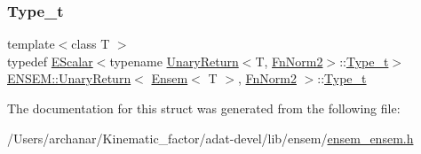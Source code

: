 \mbox{\label{structENSEM_1_1UnaryReturn_3_01Ensem_3_01T_01_4_00_01FnNorm2_01_4_ab4124c6816741e910b729ef32c1a9c37}} 
\subsubsection{\texorpdfstring{Type\_t}{Type\_t}\hspace{0.1cm}{\footnotesize\ttfamily [3/3]}}
{\footnotesize\ttfamily template$<$class T $>$ \\
typedef \mbox{\hyperlink{classENSEM_1_1EScalar}{E\+Scalar}}$<$typename \mbox{\hyperlink{structENSEM_1_1UnaryReturn}{Unary\+Return}}$<$T, \mbox{\hyperlink{structENSEM_1_1FnNorm2}{Fn\+Norm2}}$>$\+::\mbox{\hyperlink{structENSEM_1_1UnaryReturn_3_01Ensem_3_01T_01_4_00_01FnNorm2_01_4_ab4124c6816741e910b729ef32c1a9c37}{Type\+\_\+t}}$>$ \mbox{\hyperlink{structENSEM_1_1UnaryReturn}{E\+N\+S\+E\+M\+::\+Unary\+Return}}$<$ \mbox{\hyperlink{classENSEM_1_1Ensem}{Ensem}}$<$ T $>$, \mbox{\hyperlink{structENSEM_1_1FnNorm2}{Fn\+Norm2}} $>$\+::\mbox{\hyperlink{structENSEM_1_1UnaryReturn_3_01Ensem_3_01T_01_4_00_01FnNorm2_01_4_ab4124c6816741e910b729ef32c1a9c37}{Type\+\_\+t}}}



The documentation for this struct was generated from the following file\+:\begin{DoxyCompactItemize}
\item 
/\+Users/archanar/\+Kinematic\+\_\+factor/adat-\/devel/lib/ensem/\mbox{\hyperlink{adat-devel_2lib_2ensem_2ensem__ensem_8h}{ensem\+\_\+ensem.\+h}}\end{DoxyCompactItemize}
